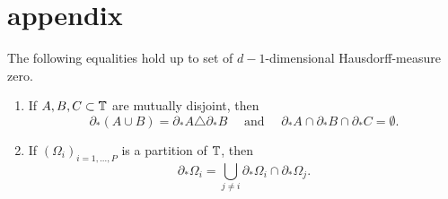 \chapter{appendix}

\begin{lemma}
	\label{identities_for_measure_theoretic_boundaries}
	The following equalities hold up to set of $d-1$-dimensional Hausdorff-measure zero.
	\begin{enumerate}
		\item 
		\label{item_disjoint_sets}
		If $ A, B, C \subset \operatorname{\mathbb{T}} $ are mutually disjoint, then
		\begin{equation*}	
			\partial_{ \ast } ( A \cup B ) = \partial_{ \ast } A \triangle \partial_{ \ast } B
			\quad 
			\text{ and }
			\quad
			\partial_{ \ast } A
			\cap
			\partial_{ \ast } B
			\cap
			\partial_{ \ast } C
			=
			\emptyset.
		\end{equation*}
		
		\item 
		\label{rewriting_boundary_via_interfaces}
		If $ ( \Omega_{ i } )_{ i = 1 , \dotsc , P } $ is a partition of $ \operatorname{\mathbb{T}} $, then
		\begin{equation*}
			\partial_{ \ast } \Omega_{ i }
			=
			\bigcup_{ j \neq i }
			\partial_{ \ast } \Omega_{ i }
			\cap
			\partial_{ \ast } \Omega_{ j }.
		\end{equation*}
	\end{enumerate}
\end{lemma}


